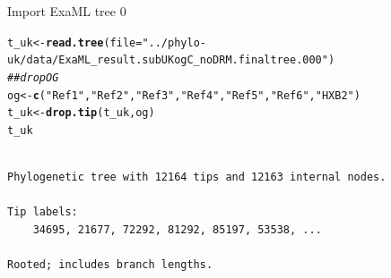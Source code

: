 \documentclass[]{revtex4}\usepackage[]{graphicx}\usepackage[]{color}
\makeatletter
\newcommand{\hlstr}[1]{\textcolor[rgb]{0.192,0.494,0.8}{#1}}%
\newcommand{\hlcom}[1]{\textcolor[rgb]{0.678,0.584,0.686}{\textit{#1}}}%
\newcommand{\hlstd}[1]{\textcolor[rgb]{0.345,0.345,0.345}{#1}}%
\newcommand{\hlkwb}[1]{\textcolor[rgb]{0.69,0.353,0.396}{#1}}%
\newcommand{\hlkwc}[1]{\textcolor[rgb]{0.333,0.667,0.333}{#1}}%
\newcommand{\hlkwd}[1]{\textcolor[rgb]{0.737,0.353,0.396}{\textbf{#1}}}%
\newenvironment{kframe}{%
 \def\at@end@of@kframe{}%
 \ifinner\ifhmode%
  \def\at@end@of@kframe{\end{minipage}}%
  \begin{minipage}{\columnwidth}%
 \fi\fi%
 \def\FrameCommand##1{\hskip\@totalleftmargin \hskip-\fboxsep
 \colorbox{shadecolor}{##1}\hskip-\fboxsep
     \hskip-\linewidth \hskip-\@totalleftmargin \hskip\columnwidth}%
 \MakeFramed {\advance\hsize-\width
   \@totalleftmargin\z@ \linewidth\hsize
   \@setminipage}}%
 {\par\unskip\endMakeFramed%
 \at@end@of@kframe}
\newenvironment{knitrout}{}{} %
\makeatother
\begin{document}
Import ExaML tree 0
\begin{knitrout}
\color{fgcolor}\begin{kframe}
\begin{alltt}
\hlstd{t_uk} \hlkwb{<-} \hlkwd{read.tree}\hlstd{(}\hlkwc{file} \hlstd{=} \hlstr{"../phylo-uk/data/ExaML_result.subUKogC_noDRM.finaltree.000"}\hlstd{)}
\hlcom{## drop OG}
\hlstd{og} \hlkwb{<-} \hlkwd{c}\hlstd{(}\hlstr{"Ref1"}\hlstd{,} \hlstr{"Ref2"}\hlstd{,} \hlstr{"Ref3"}\hlstd{,} \hlstr{"Ref4"}\hlstd{,} \hlstr{"Ref5"}\hlstd{,} \hlstr{"Ref6"}\hlstd{,} \hlstr{"HXB2"}\hlstd{)}
\hlstd{t_uk} \hlkwb{<-} \hlkwd{drop.tip}\hlstd{(t_uk, og )}
\hlstd{t_uk}
\end{alltt}
\begin{verbatim}

Phylogenetic tree with 12164 tips and 12163 internal nodes.

Tip labels:
	34695, 21677, 72292, 81292, 85197, 53538, ...

Rooted; includes branch lengths.
\end{verbatim}
\end{kframe}
\end{knitrout}
\end{document}
